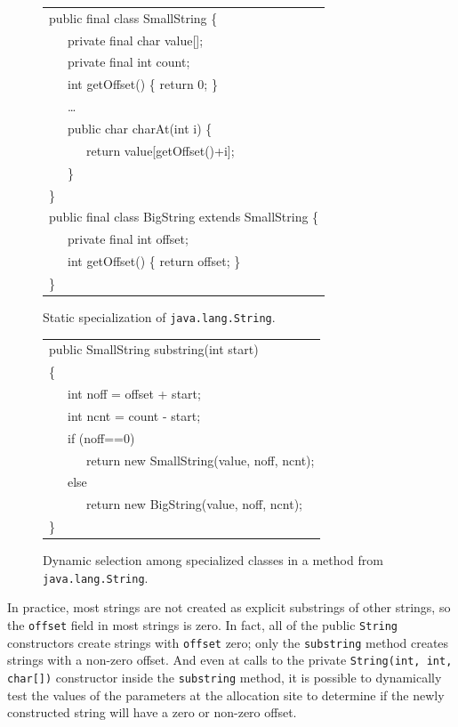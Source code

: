 \documentclass{acmconf}
\begin{document}
\begin{figure}[tp]
\renewcommand{\baselinestretch}{0.6}%
{\small\tt\renewcommand{\>}{~~~}\begin{tabular}[t]{l}%
public final class SmallString \{\\
\>private final char value[];\\
\>private final int count;\\
\>int getOffset() \{ return 0; \}\\
\>\ldots\\
\>public char charAt(int i) \{\\
\>\>return value[getOffset()+i];\\
\>\}\\
\}\\
public final class BigString extends SmallString \{\\
\>private final int offset;\\
\>int getOffset() \{ return offset; \}\\
\}\\
\end{tabular}}%
\caption{Static specialization of {\tt java.lang.String}.}
\label{fig:split}
\end{figure}
\begin{figure}[tp]
\renewcommand{\baselinestretch}{0.6}%
{\small\tt\renewcommand{\>}{~~~}\begin{tabular}[t]{l}%
public SmallString substring(int start)\\
\{\\
\>int noff = offset + start;\\
\>int ncnt = count - start;\\
\>if (noff==0)\\
\>\>return new SmallString(value, noff, ncnt);\\
\>else\\
\>\>return new BigString(value, noff, ncnt);\\
\}\\
\end{tabular}}%
\caption{Dynamic selection among specialized classes in a method
             from {\tt java.lang.String}.
}
\label{fig:dynsel}
\end{figure}

In practice, most strings are not created as explicit substrings of other
strings, so
the {\tt offset} field in most strings is zero.
In fact, all of the public {\tt String} constructors create
strings with {\tt offset} zero; only the {\tt substring} method
creates strings with a non-zero offset. And even at 
calls to the private {\tt String(int, int, char[])} constructor
inside the {\tt substring} method, it is possible to dynamically
test the values of the parameters at the allocation site to determine
if the newly
constructed string will have a zero or non-zero offset.
\end{document}
